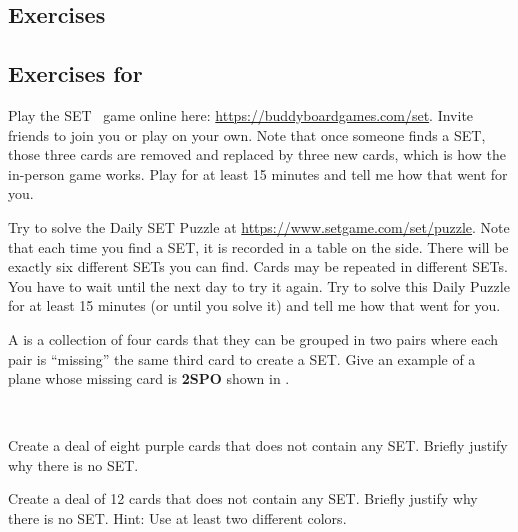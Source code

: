 \subsection{Exercises}


\subsection*{Exercises for  \subsetgame}

\begin{exer}[\exerP] %
\label{exer_set_game_online}
    Play the SET\texttrademark~ game online here: \url{https://buddyboardgames.com/set}.  Invite friends to join you or play on your own. Note that once someone finds a SET, those three cards are removed and replaced by three new cards, which is how the in-person game works.  Play for at least 15 minutes and tell me how that went for you.   
\end{exer}

\begin{exer}[\exerU] %
\label{exer_set_game_daily_puzzle}
    Try to solve the Daily SET Puzzle at \url{https://www.setgame.com/set/puzzle}.  Note that each time you find a SET, it is recorded in a table on the side.  There will be exactly six different SETs you can find.  Cards may be repeated in different SETs.  You have to wait until the next day to try it again.  Try to solve this Daily Puzzle for at least 15 minutes (or until you solve it) and tell me how that went for you.   
\end{exer}

\begin{exer}[\exerE] %
\label{exer_set_game_plane}
    A  is a collection of four cards that they can be grouped in two pairs where each pair is ``missing'' the same third card to create a SET.  Give an example of a plane whose missing card is \textbf{2SPO} shown in .
\end{exer}

\begin{exer}[\exerE] %
\label{exer_set_game_cards_noset}
~
    \begin{exerpart}
        \item Create a deal of eight purple cards that does not contain any SET. Briefly justify why there is no SET. 
        \item Create a deal of 12 cards that does not contain any SET. Briefly justify why there is no SET.  Hint: Use at least two different colors.
    \end{exerpart}
\end{exer}

